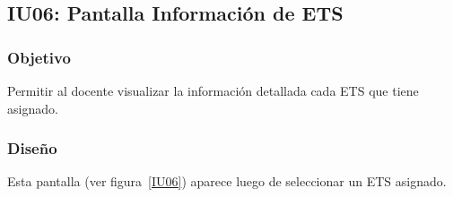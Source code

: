 \subsection{IU06: Pantalla Información de ETS}

\newpage

\subsubsection{Objetivo}
Permitir al docente visualizar la información detallada cada ETS que tiene asignado.

\subsubsection{Diseño}
Esta pantalla  (ver figura~\ref{IU06}) aparece luego de seleccionar un ETS asignado.



